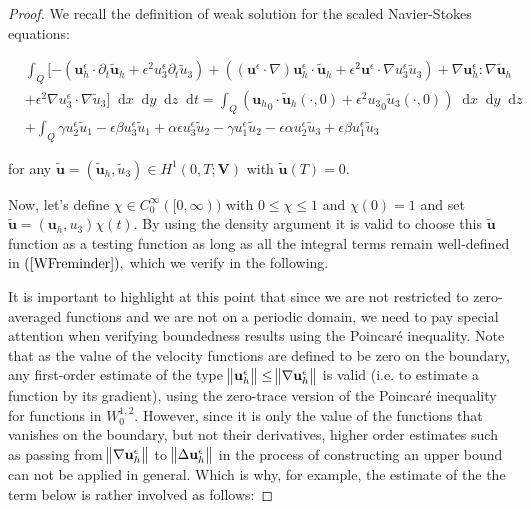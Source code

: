\documentclass[11pt]{article}
\newcommand*\diff{\mathop{}\!\mathrm{d}}
\begin{document}
\begin{proof}

We recall the definition of weak solution for the scaled Navier-Stokes equations:

\begin{equation} \label{WFreminder}
  \begin{split}
    & \int_Q [ - (\mathbf{u}_h^\epsilon \cdot \partial_t \tilde{\mathbf{u}}_h + \epsilon^2 u_3^\epsilon \partial_t \tilde{u}_3) +( (\mathbf{u}^\epsilon \cdot \nabla) \mathbf{u}_h^\epsilon \cdot \tilde{\mathbf{u}}_h + \epsilon^2 \mathbf{u}^\epsilon \cdot \nabla u_3^\epsilon \tilde{u}_3 ) + \nabla \mathbf{u}_h^\epsilon : \nabla \tilde{\mathbf{u}}_h \\
    & + \epsilon^2 \nabla u_3^\epsilon \cdot \nabla \tilde{u}_3 ] \diff x \diff y \diff z \diff t = \int_Q ({\mathbf{u}_h}_0 \cdot \tilde{\mathbf{u}}_h (\cdot , 0) + \epsilon^2 {u_3}_0 \tilde{u}_3 (\cdot , 0)) \diff x \diff y \diff z \\
    & + \int_Q  \gamma u_2^\epsilon \tilde{u}_1 - \epsilon \beta u_3^\epsilon \tilde{u}_1 + \alpha \epsilon u_3^\epsilon \tilde{u}_2 - \gamma u_1^\epsilon \tilde{u}_2 - \epsilon \alpha u_2^\epsilon \tilde{u}_3 + \epsilon \beta u_1^\epsilon \tilde{u}_3
  \end{split}
\end{equation}

for any $\tilde{\mathbf{u}} = (\tilde{\mathbf{u}}_h, \tilde{u}_3) \in H^1 (0,T;\mathbf{V})$ with $\tilde{\mathbf{u}}(T) = 0.$

Now, let's define $\chi \in C_0^\infty ([0, \infty))$ with $0 \leq \chi \leq 1$ and $\chi (0) = 1$ and set $\tilde{\mathbf{u}} = (\mathbf{u}_h,u_3) \chi (t).$ By using the density argument it is valid to choose this $\tilde{\mathbf{u}}$ function as a testing function as long as all the integral terms remain well-defined in $(\ref{WFreminder}),$ which we verify in the following.

It is important to highlight at this point that since we are not restricted to zero-averaged functions and we are not on a periodic domain, we need to pay special attention when verifying boundedness results using the Poincar\'e inequality. Note that as the value of the velocity functions are defined to be zero on the boundary, any first-order estimate of the type $\norm{\mathbf{u}_h^\epsilon} \leq \norm{\nabla \mathbf{u}_h^\epsilon}$ is valid (i.e. to estimate a function by its gradient), using the zero-trace version of the Poincar\'e inequality for functions in $W^{1,2}_0.$ However, since it is only the value of the functions that vanishes on the boundary, but not their derivatives, higher order estimates such as passing from $\norm{\nabla \mathbf{u}_h^\epsilon}$ to $\norm{\Delta \mathbf{u}_h^\epsilon}$ in the process of constructing an upper bound can not be applied in general. Which is why, for example, the estimate of the the term below is rather involved as follows:


\end{proof}
\end{document}
